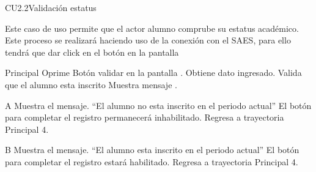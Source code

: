 \begin{UseCase}{CU2.2}{Validación estatus}{
		\noindent Este caso de uso permite que el actor alumno comprube su estatus académico. Este proceso se realizará haciendo uso de la conexión con el SAES, para ello tendrá que dar click en el botón  en la pantalla  

	}
		\end{UseCase}
    \begin{UCtrayectoria}{Principal}
    \UCpaso[\UCactor] Oprime Botón validar en la pantalla .
    \UCpaso Obtiene dato ingresado.
	\UCpaso Valida que el alumno esta inscrito 
    \UCpaso Muestra mensaje .  
    \end{UCtrayectoria}
    
	\begin{UCtrayectoriaA}{A}{}
		\UCpaso Muestra el mensaje. “El alumno no esta inscrito en el periodo actual”
		\UCpaso El botón para completar el registro permanecerá inhabilitado.
		\UCpaso Regresa a trayectoria Principal 4.
	\end{UCtrayectoriaA}
	
	\begin{UCtrayectoriaA}{B}{}
		\UCpaso Muestra el mensaje. “El alumno esta inscrito en el periodo actual”
		\UCpaso El botón para completar el registro estará habilitado.
        \UCpaso Regresa a trayectoria Principal 4.
	\end{UCtrayectoriaA}
